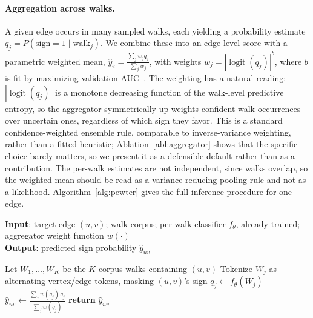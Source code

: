 \documentclass[sigconf, review, anonymous]{acmart}
\theoremstyle{plain}
\theoremstyle{definition}
\begin{document}
\paragraph{Aggregation across walks.} A given edge occurs in many sampled walks, each yielding a probability estimate $q_j=P(\text{sign}=1\mid \text{walk}_j)$. We combine these into an edge-level score with a parametric weighted mean, $\hat{y}_e = \frac{\sum_j w_j q_j}{\sum_j w_j}$, with weights $w_j = |\operatorname{logit}(q_j)|^{b}$, where $b$ is fit by maximizing validation AUC~\citep{nelder1965simplex}. The weighting has a natural reading: $|\operatorname{logit}(q_j)|$ is a monotone decreasing function of the walk-level predictive entropy, so the aggregator symmetrically up-weights confident walk occurrences over uncertain ones, regardless of which sign they favor. This is a standard confidence-weighted ensemble rule, comparable to inverse-variance weighting, rather than a fitted heuristic; Ablation~\ref{abl:aggregator} shows that the specific choice barely matters, so we present it as a defensible default rather than as a contribution. The per-walk estimates are not independent, since walks overlap, so the weighted mean should be read as a variance-reducing pooling rule and not as a likelihood. Algorithm~\ref{alg:pewter} gives the full inference procedure for one edge.

\begin{algorithm}[tb]
\caption{Pewter: inference for edge $(u,v)$}
\label{alg:pewter}
\textbf{Input}: target edge $(u,v)$; walk corpus; per-walk classifier $f_\theta$, already trained; aggregator weight function $w(\cdot)$\\
\textbf{Output}: predicted sign probability $\hat y_{uv}$
\begin{algorithmic}[1]
\STATE Let $W_1,\ldots,W_K$ be the $K$ corpus walks containing $(u,v)$
  \STATE Tokenize $W_j$ as alternating vertex/edge tokens, masking $(u,v)$'s sign
  \STATE $q_j \gets f_\theta(W_j)$ 
\ENDFOR
\STATE $\hat y_{uv} \gets \frac{\sum_j w(q_j)\, q_j}{\sum_j w(q_j)}$
\STATE \textbf{return} $\hat y_{uv}$
\end{algorithmic}
\end{algorithm}
\end{document}
